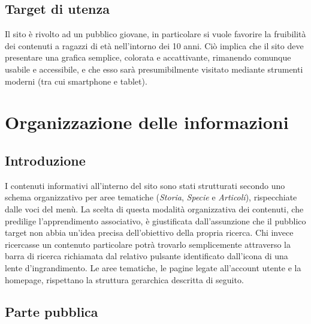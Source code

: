 \documentclass[12pt]{article}
\begin{document}
	\subsection{Target di utenza}
	Il sito è rivolto ad un pubblico giovane, in particolare si vuole favorire la fruibilità dei contenuti a ragazzi di età nell'intorno dei 10 anni. Ciò implica che il sito deve presentare una grafica semplice, colorata e accattivante, rimanendo comunque usabile e accessibile, e che esso sarà presumibilmente visitato mediante strumenti moderni (tra cui smartphone e tablet).
	
	\newpage
	\section{Organizzazione delle informazioni}
	
	\subsection{Introduzione}
	I contenuti informativi all'interno del sito sono stati strutturati secondo uno schema organizzativo per aree tematiche (\textit{Storia}, \textit{Specie} e \textit{Articoli}), rispecchiate dalle voci del menù. La scelta di questa modalità organizzativa dei contenuti, che predilige l'apprendimento associativo, è giustificata dall'assunzione che il pubblico target non abbia un'idea precisa dell'obiettivo della propria ricerca. Chi invece ricercasse un contenuto particolare potrà trovarlo semplicemente attraverso la barra di ricerca richiamata dal relativo pulsante identificato dall'icona di una lente d'ingrandimento.
	Le aree tematiche, le pagine legate all'account utente e la homepage, rispettano la struttura gerarchica descritta di seguito.
	
	\subsection{Parte pubblica}
	
\end{document}
